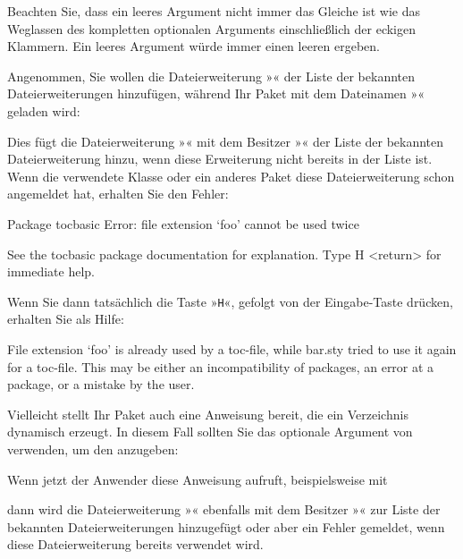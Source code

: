 Beachten Sie, dass ein leeres Argument 
nicht immer das Gleiche ist wie das Weglassen des kompletten optionalen
Arguments einschließlich der eckigen Klammern. Ein leeres Argument würde immer
einen leeren  ergeben.
\begin{Example}
  Angenommen, Sie wollen die Dateierweiterung »« der Liste der
  bekannten Dateierweiterungen hinzufügen, während Ihr Paket mit dem
  Dateinamen »« geladen wird:
\begin{lstcode}
\end{lstcode}
  Dies fügt die Dateierweiterung »« mit dem Besitzer
  »« der Liste der bekannten Dateierweiterung hinzu, wenn diese
  Erweiterung nicht bereits in der Liste ist. Wenn die verwendete
  Klasse oder ein anderes Paket diese Dateierweiterung schon angemeldet hat,
  erhalten Sie den Fehler:
\begin{lstoutput}[breakatwhitespace]
  Package tocbasic Error: file extension `foo' cannot be used twice

  See the tocbasic package documentation for explanation.
  Type H <return> for immediate help.
\end{lstoutput}
  Wenn Sie dann tatsächlich die Taste »\texttt{H}«, gefolgt von der
  Eingabe-Taste drücken, erhalten Sie als Hilfe:
\begin{lstoutput}[breakatwhitespace]
  File extension `foo' is already used by a toc-file, while bar.sty
  tried to use it again for a toc-file.
  This may be either an incompatibility of packages, an error at a package,
  or a mistake by the user.
\end{lstoutput}

  Vielleicht stellt Ihr Paket auch eine Anweisung bereit, die ein
  Verzeichnis dynamisch erzeugt. In diesem Fall sollten Sie das
  optionale Argument von  verwenden, um den
   anzugeben:
\begin{lstcode}
  \newcommand*{\createnewlistofsomething}[1]{%
    \addtotoclist[bar.sty]{#1}%
  }
\end{lstcode}
  Wenn jetzt der Anwender diese Anweisung aufruft, beispielsweise mit
\begin{lstcode}
\end{lstcode}
  dann wird die Dateierweiterung »« ebenfalls mit dem Besitzer
  »« zur Liste der bekannten Dateierweiterungen hinzugefügt
  oder aber ein Fehler gemeldet, wenn diese Dateierweiterung bereits verwendet
  wird. 
\end{Example}

